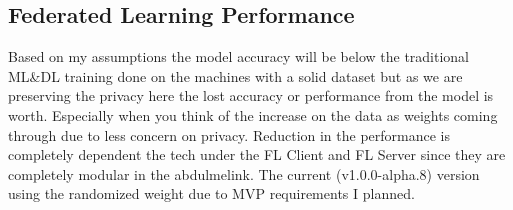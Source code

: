 \subsection{Federated Learning Performance}

Based on my assumptions the model accuracy will be below the traditional ML&DL training done on the machines with a solid dataset but as we are preserving the privacy here the lost accuracy or performance from the model is worth. Especially when you think of the increase on the data as weights coming through due to less concern on privacy. Reduction in the performance is completely dependent the tech under the FL Client and FL Server since they are completely modular in the abdulmelink. The current (v1.0.0-alpha.8) version using the randomized weight due to MVP requirements I planned.

